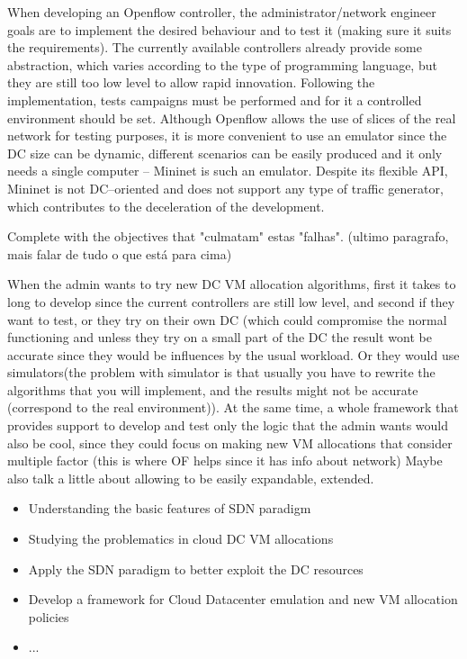 \documentclass[12pt,english]{book}
\begin{document}
When developing an Openflow controller, the administrator/network engineer goals are to implement the desired behaviour and to test it (making sure it suits the requirements).
The currently available controllers already provide some abstraction, which varies according to the type of programming language, but they are still too low level to allow rapid innovation. 
Following the implementation, tests campaigns must be performed and for it a controlled environment should be set.
Although Openflow allows the use of slices of the real network for testing purposes, it is more convenient to use an emulator since the DC size can be dynamic, different scenarios can be easily produced and it only needs a single computer -- Mininet is such an emulator.
Despite its flexible API, Mininet is not DC--oriented and does not support any type of traffic generator, which contributes to the deceleration of the development.

Complete with the objectives that "culmatam" estas "falhas". (ultimo paragrafo, mais falar de tudo o que está para cima)

When the admin wants to try new DC VM allocation algorithms, first it takes to long to develop since the current controllers are still low level, and second if they want to test, or they try on their own DC (which could compromise the normal functioning and unless they try on a small part of the DC the result wont be accurate since they would be influences by the usual workload.
Or they would use simulators(the problem with simulator is that usually you have to rewrite the algorithms that you will implement, and the results might not be accurate (correspond to the real environment)).
At the same time, a whole framework that provides support to develop and test only the logic that the admin wants would also be cool, since they could focus on making new VM allocations that consider multiple factor (this is where OF helps since it has info about network)
Maybe also talk a little about allowing to be easily expandable, extended.

\begin{itemize}
	\item Understanding the basic features of SDN paradigm
	\item Studying the problematics in cloud DC VM allocations
	\item Apply the SDN paradigm to better exploit the DC resources
	\item Develop a framework for Cloud Datacenter emulation and new VM allocation policies
	\item ...
\end{itemize}
\end{document}
